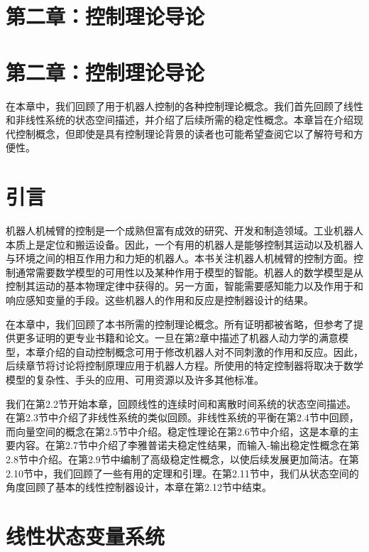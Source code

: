 \documentclass[UTF8,12pt,a4paper]{ctexart}
\theoremstyle{definition}
\begin{document}
  \section*{第二章：控制理论导论}
\fi

\ifstandalone
\else
  \section*{第二章：控制理论导论}
\fi

在本章中，我们回顾了用于机器人控制的各种控制理论概念。我们首先回顾了线性和非线性系统的状态空间描述，并介绍了后续所需的稳定性概念。本章旨在介绍现代控制概念，但即使是具有控制理论背景的读者也可能希望查阅它以了解符号和方便性。

\section{引言}

机器人机械臂的控制是一个成熟但富有成效的研究、开发和制造领域。工业机器人本质上是定位和搬运设备。因此，一个有用的机器人是能够控制其运动以及机器人与环境之间的相互作用力和力矩的机器人。本书关注机器人机械臂的控制方面。控制通常需要数学模型的可用性以及某种作用于模型的智能。机器人的数学模型是从控制其运动的基本物理定律中获得的。另一方面，智能需要感知能力以及作用于和响应感知变量的手段。这些机器人的作用和反应是控制器设计的结果。

在本章中，我们回顾了本书所需的控制理论概念。所有证明都被省略，但参考了提供更多证明的更专业书籍和论文。一旦在第2章中描述了机器人动力学的满意模型，本章介绍的自动控制概念可用于修改机器人对不同刺激的作用和反应。因此，后续章节将讨论将控制原理应用于机器人方程。所使用的特定控制器将取决于数学模型的复杂性、手头的应用、可用资源以及许多其他标准。

我们在第2.2节开始本章，回顾线性的连续时间和离散时间系统的状态空间描述。在第2.3节中介绍了非线性系统的类似回顾。非线性系统的平衡在第2.4节中回顾，而向量空间的概念在第2.5节中介绍。稳定性理论在第2.6节中介绍，这是本章的主要内容。在第2.7节中介绍了李雅普诺夫稳定性结果，而输入-输出稳定性概念在第2.8节中介绍。在第2.9节中编制了高级稳定性概念，以使后续发展更加简洁。在第2.10节中，我们回顾了一些有用的定理和引理。在第2.11节中，我们从状态空间的角度回顾了基本的线性控制器设计，本章在第2.12节中结束。

\section{线性状态变量系统}
\end{document}
